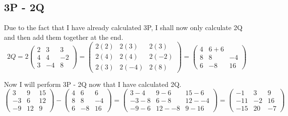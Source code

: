 \documentclass[a4paper,12pt]{article}
\begin{document}
    \subsection{3P - 2Q}
    Due to the fact that I have already calculated 3P, I shall now only calculate 2Q and then add them together at the end.
      \begin{equation}
        2Q =
        2
        \begin{pmatrix}
          2 & 3 & 3\\
          4 & 4 & -2\\
          3 & -4 & 8
        \end{pmatrix}
        =
        \begin{pmatrix}
          2(2) & 2(3) & 2(3)\\
          2(4) & 2(4) & 2(-2)\\
          2(3) & 2(-4) & 2(8)
        \end{pmatrix}
        =
        \begin{pmatrix}
          4 & 6 + 6\\
          8 & 8 & -4\\
          6 & -8 & 16
        \end{pmatrix}
      \end{equation}

      Now I will perform 3P - 2Q now that I have calculated 2Q.
      \begin{equation}
        \begin{pmatrix}
          3 & 9 & 15\\
          -3 & 6 & 12\\
          -9 & 12 & 9
        \end{pmatrix}
        -
        \begin{pmatrix}
          4 & 6 & 6\\
          8 & 8 & -4\\
          6 & -8 & 16
        \end{pmatrix}
        =
        \begin{pmatrix}
          3 - 4 & 9 - 6 & 15 - 6\\
          -3 - 8 & 6 - 8 & 12 - -4\\
          -9 - 6 & 12 - -8 & 9 - 16
        \end{pmatrix}
        =
        \begin{pmatrix}
          -1 & 3 & 9\\
          -11 & -2 & 16\\
          -15 & 20 & -7
        \end{pmatrix}
      \end{equation}
\end{document}
